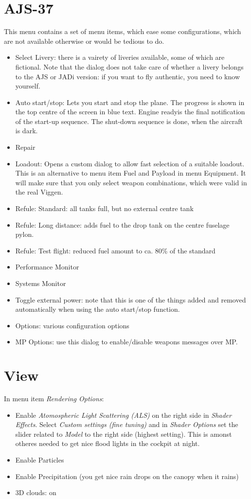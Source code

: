 \section{AJS-37}
This menu contains a set of menu items, which ease some configurations, which are not available otherwise or would be tedious to do.
\begin{itemize}
\item Select Livery: there is a vairety of liveries available, some of which are fictional. Note that the dialog does not take care of whether a livery belongs to the AJS or JADi version: if you want to fly authentic, you need to know yourself.
\item Auto start/stop: Lets you start and stop the plane. The progress is shown in the top centre of the screen in blue text. \glqq Engine ready\grqq is the final notification of the start-up sequence. The shut-down sequence is done, when the aircraft is dark.
\item Repair
\item Loadout: Opens a custom dialog to allow fast selection of a suitable loadout. This is an alternative to menu item Fuel and Payload in menu Equipment. It will make sure that you only select weapon combinations, which were valid in the real Viggen.
\item Refule: Standard: all tanks full, but no external centre tank
\item Refule: Long distance: adds fuel to the drop tank on the centre fuselage pylon.
\item Refule: Test flight: reduced fuel amount to ca. 80\% of the standard
\item Performance Monitor
\item Systems Monitor
\item Toggle external power: note that this is one of the things added and removed automatically when using the auto start/stop function.
\item Options: various configuration options
\item MP Options: use this dialog to enable/disable weapons messages over MP.
\end{itemize}

\section{View}
In menu item \emph{Rendering Options}:
\begin{itemize}
\item Enable \emph{Atomospheric Light Scattering (ALS)} on the right side in \emph{Shader Effects}. Select \emph{Custom settings (fine tuning)} and in \emph{Shader Options} set the slider related to \emph{Model} to the right side (highest setting). This is amonst otheres needed to get nice flood lights in the cockpit at night.
\item Enable Particles
\item Enable Precipitation (you get nice rain drops on the canopy when it rains)
\item 3D clouds: on
\end{itemize}

